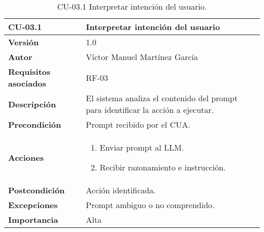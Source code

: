 \begin{table}[p]
    \centering
    \begin{tabularx}{\linewidth}{ p{} p{} }
        \toprule
        \textbf{CU-03.1}    & \textbf{Interpretar intención del usuario}\\
        \toprule
        \textbf{Versión}              & 1.0 \\
        \textbf{Autor}                & Víctor Manuel Martínez García \\
        \textbf{Requisitos asociados} & RF-03 \\
        \textbf{Descripción}          & El sistema analiza el contenido del prompt para identificar la acción a ejecutar.\\
        \textbf{Precondición}         & Prompt recibido por el CUA.\\
        \textbf{Acciones}             &
        \begin{enumerate}
          \item Enviar prompt al LLM.
          \item Recibir razonamiento e instrucción.
        \end{enumerate}\\
        \textbf{Postcondición}        & Acción identificada.\\
        \textbf{Excepciones}          & Prompt ambiguo o no comprendido.\\
        \textbf{Importancia}          & Alta \\
        \bottomrule
    \end{tabularx}
    \caption{CU-03.1 Interpretar intención del usuario.}
    \label{CU-03.1 Interpretar intención del usuario}
\end{table}


